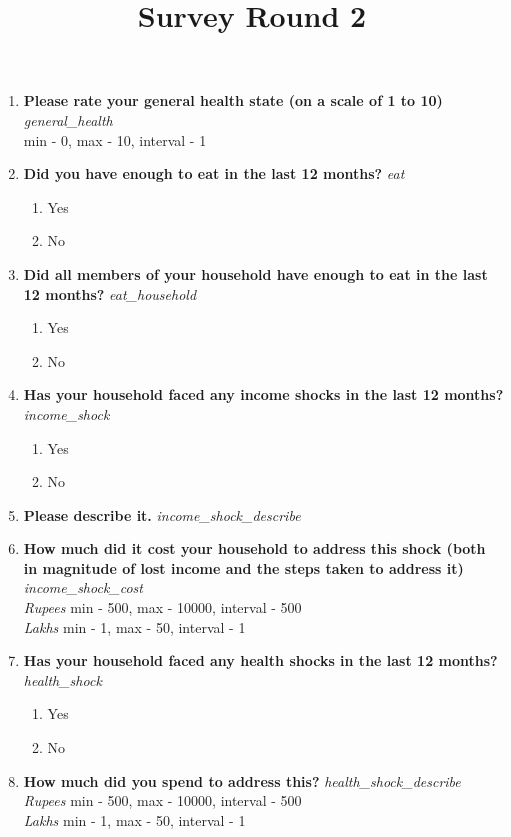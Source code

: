\documentclass{article}
\begin{document}
\title{Survey Round 2}
 \maketitle
\begin{enumerate}
\item {\bfseries Please rate your general health state (on a scale of 1 to 10)}\emph{ general\_health }
\\min - 0, max - 10, interval - 1

\item {\bfseries Did you have enough to eat in the last 12 months?}\emph{ eat }
\begin{enumerate}
\item Yes
\item No
\end{enumerate}
\item {\bfseries Did all members of your household have enough to eat in the last 12 months?}\emph{ eat\_household }
\begin{enumerate}
\item Yes
\item No
\end{enumerate}
\item {\bfseries Has your household faced any income shocks in the last 12 months?}\emph{ income\_shock }
\begin{enumerate}
\item Yes
\item No
\end{enumerate}
\item {\bfseries Please describe it.}\emph{ income\_shock\_describe }

\item {\bfseries How much did it cost your household to address this shock (both in magnitude of lost income and the steps taken to address it)}\emph{ income\_shock\_cost }
\\ \emph{ Rupees }min - 500, max - 10000, interval - 500
\\ \emph{ Lakhs }min - 1, max - 50, interval - 1

\item {\bfseries Has your household faced any health shocks in the last 12 months?}\emph{ health\_shock }
\begin{enumerate}
\item Yes
\item No
\end{enumerate}
\item {\bfseries How much did you spend to address this?}\emph{ health\_shock\_describe }
\\ \emph{ Rupees }min - 500, max - 10000, interval - 500
\\ \emph{ Lakhs }min - 1, max - 50, interval - 1


\end{enumerate}
\end{document}
